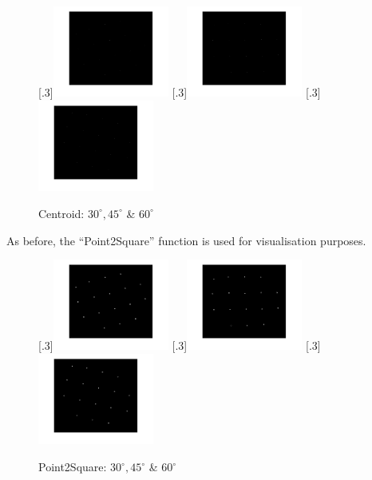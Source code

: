 \documentclass[a4paper]{article}
\begin{document}
	\begin{figure}[H]
		\centering
		[.3\linewidth]{\includegraphics[height=3cm]{Results/Q3/a/qaCentroid30.jpg}}%
		[.3\linewidth]{\includegraphics[height=3cm]{Results/Q3/a/qaCentroid45.jpg}}%
		[.3\linewidth]{\includegraphics[height=3cm]{Results/Q3/a/qaCentroid60.jpg}}%
		\caption{Centroid: $30^\circ, 45^\circ$ \& $60^\circ$}
		\label{fig:}
	\end{figure}
	\par As before, the ``Point2Square'' function is used for visualisation
	purposes.
	\begin{figure}[H]
		\centering
		[.3\linewidth]{\includegraphics[height=3cm]{Results/Q3/a/qaP2S30.jpg}}%
		[.3\linewidth]{\includegraphics[height=3cm]{Results/Q3/a/qaP2S45.jpg}}%
		[.3\linewidth]{\includegraphics[height=3cm]{Results/Q3/a/qaP2S60.jpg}}%
		\caption{Point2Square: $30^\circ, 45^\circ$ \& $60^\circ$}
		\label{fig:}
	\end{figure}
\end{document}
